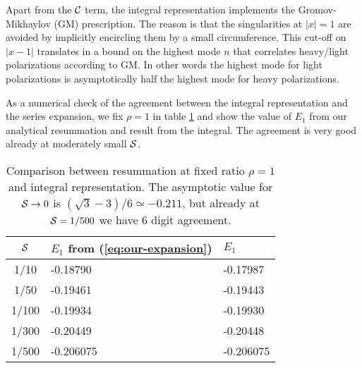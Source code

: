 Apart from the $\mathcal C$ term, the integral representation implements the Gromov-Mikhaylov (GM) prescription. The reason is that the singularities at $|x|=1$ are avoided by implicitly encircling them by a small circumference. This cut-off on $|x-1|$ translates in a bound on the highest mode $n$ that correlates heavy/light polarizations according to GM. In other words the highest mode for light polarizations is asymptotically half the highest mode for heavy polarizations. 

As a numerical check of the agreement between the integral representation and the series expansion, 
we fix $\rho=1$ in table \ref{tab:check1} and show
the value of $E_{1}$ from our analytical resummation and result from the integral. The agreement is very good already 
at moderately small $\mathcal S$.

\begin{table}[htb]
\begin{center}
\begin{tabular}{c|ll}
$\mathcal S$ & $E_{1}$ from (\ref{eq:our-expansion}) & $E_{1}$ \\
\hline
1/10 & -0.18790 & -0.17987  \\
1/50 & -0.19461 & -0.19443 \\
1/100 & -0.19934 & -0.19930 \\
1/300 & -0.20449 & -0.20448 \\
1/500 & -0.206075 & -0.206075
\end{tabular}
\caption[Numerical comparison of integral representation and resummation]{Comparison between resummation at fixed ratio
$\rho=1$ and integral representation. The asymptotic value for $\mathcal S\to 0$ is $(\sqrt 3-3)/6\simeq -0.211$, but already at $\mathcal S = 1/500$ we have 6 digit agreement.
}
\label{tab:check1}
\end{center}
\end{table}



